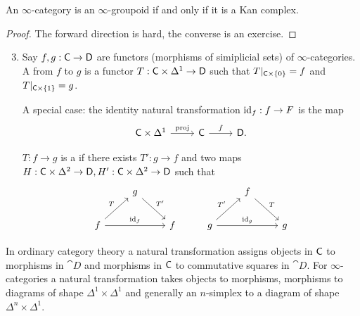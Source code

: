 \begin{theorem}[Joyal]
An $\infty$-category is an $\infty$-groupoid if and only if it is a Kan complex.
\end{theorem}
\begin{proof}
The forward direction is hard, the converse is an exercise.
\end{proof}
\begin{definition}\leavevmode
\begin{enumerate}[1.]
		\setcounter{enumi}{2}
	\item Say $f,g:\C\to \cat{D}$ are functors (morphisms of simiplicial sets) of
		$\infty$-categories. A  from $f$ to $g$ is a functor
		$T:\C\times \Delta^{1}\to \cat{D}$ such that $T|_{\mathsf{C}\times \{0\} }=f$ and $T|_{\mathsf{C}\times \{1\}}=g$.

		A special case: the identity natural transformation $\id_f:f\to F$ is the map
		\[
			\begin{tikzcd}
				\C\times \Delta^{1} \ar[r,"\text{proj}"] & \C \ar[r,"f"] & \cat{D}.
			\end{tikzcd}
		\]

		$T:f\to g$ is a  if there exists $T':g\to f$ and two maps
		$H:\C\times \Delta^2\to \cat{D},H':\C\times \Delta^2\to \cat{D}$ such that
		\[
			\begin{tikzcd}
				& g \ar[dr,"T'"] & & & f \ar[dr,"T"] \\
				f \ar[ur,"T"] \ar[rr,"\id_f"] & & f & g \ar[ur,"T'"] \ar[rr,"\id_g"] & & g
			\end{tikzcd}
		\]
\end{enumerate}
\end{definition}
In ordinary category theory a natural transformation assigns objects in $\mathsf{C}$ to morphisms
in $\cat{D}$ and morphisms in $\mathsf{C}$ to commutative squares in $\cat{D}$. For
$\infty$-categories a natural transformation takes objects to morphisms, morphisms to
diagrams of shape $\Delta^{1}\times \Delta^{1}$ and generally an $n$-simplex to a diagram
of shape $\Delta^{n}\times \Delta^{1}$.


